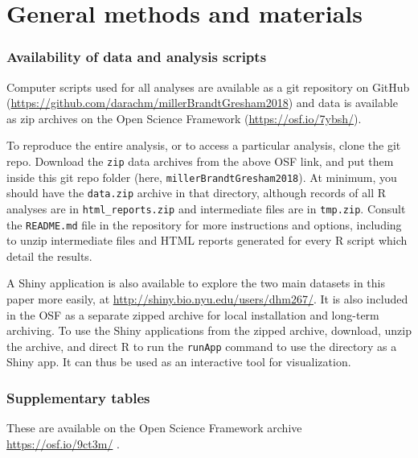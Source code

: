 \section{General methods and materials}

\subsubsection{Availability of data and analysis scripts}

\label{subsubsection:codeanddata}

Computer scripts used for all analyses are available as a git repository
on GitHub\\
(\url{https://github.com/darachm/millerBrandtGresham2018})
and data is available as zip archives on the Open Science
Framework (\url{https://osf.io/7ybsh/}).

To reproduce the entire analysis, or to access a particular 
analysis, clone the git repo.  
Download the \texttt{zip} data archives from the above
OSF link, and put them inside this git repo folder 
(here, \texttt{millerBrandtGresham2018}).
At minimum, you should have the \texttt{data.zip} archive in that directory,
although records of all R analyses are in \texttt{html\_reports.zip}
and intermediate files are in \texttt{tmp.zip}.
Consult the \texttt{README.md} file in the repository for more instructions
and options, including to unzip intermediate files and HTML
reports generated for every R script which detail the results.

A Shiny application is also available to explore the two main 
datasets in this paper more easily, at
\url{http://shiny.bio.nyu.edu/users/dhm267/}. It
is also included in the OSF as a separate zipped archive for local
installation and long-term archiving. 
To use the Shiny applications from the zipped archive, download,
unzip the archive, and direct R to run the \texttt{runApp} command
to use the directory as a Shiny app. It can thus be used as an
interactive tool for visualization.

\subsubsection{Supplementary tables}

These are available on the Open Science Framework archive
\url{https://osf.io/9ct3m/} .

